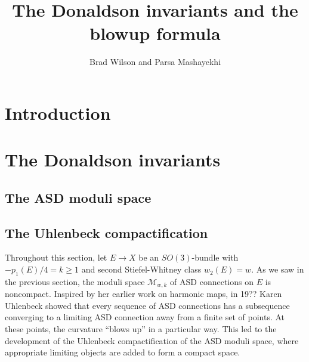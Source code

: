 \documentclass[a4paper]{article}
\title{The Donaldson invariants and the blowup formula}
\author{Brad Wilson and Parsa Mashayekhi}
\newcommand{\M}{\mathcal{M}}
\newcommand{\ra}{\rightarrow}
\theoremstyle{definition}
\numberwithin{theorem}{subsection}
\begin{document}
\maketitle

\tableofcontents

\section{Introduction}

\section{The Donaldson invariants}


\subsection{The ASD moduli space}



\subsection{The Uhlenbeck compactification}



Throughout this section, let $E\ra X$ be an $SO(3)$-bundle with $-p_1(E)/4=k\geq 1$ and second Stiefel-Whitney class $w_2(E)=w$. As we saw in the previous section, the moduli space $\M_{w,k}$ of ASD connections on $E$ is noncompact. Inspired by her earlier work on harmonic maps, in 19?? Karen Uhlenbeck showed that every sequence of ASD connections has a subsequence converging to a limiting ASD connection away from a finite set of points. At these points, the curvature ``blows up'' in a particular way. This led to the development of the Uhlenbeck compactification of the ASD moduli space, where appropriate limiting objects are added to form a compact space. 
\newline
\end{document}
